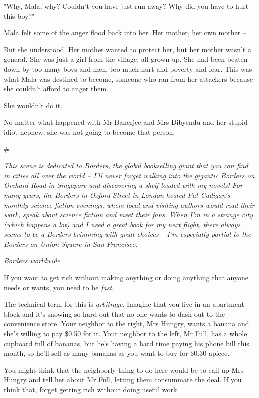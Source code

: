 "Why, Mala, why? Couldn't you have just run away? Why did you have
to hurt this boy?"

Mala felt some of the anger flood back into her. Her mother, her
own mother --

But she understood. Her mother wanted to protect her, but her
mother wasn't a general. She was just a girl from the village, all
grown up. She had been beaten down by too many boys and men, too
much hurt and poverty and fear. This was what Mala was destined to
become, someone who ran from her attackers because she couldn't
afford to anger them.

She wouldn't do it.

No matter what happened with Mr Banerjee and Mrs Dibyendu and her
stupid idiot nephew, she was not going to become that person.

\#

\emph{This scene is dedicated to Borders, the global bookselling giant that you can find in cities all over the world -- I'll never forget walking into the gigantic Borders on Orchard Road in Singapore and discovering a shelf loaded with my novels! For many years, the Borders in Oxford Street in London hosted Pat Cadigan's monthly science fiction evenings, where local and visiting authors would read their work, speak about science fiction and meet their fans. When I'm in a strange city (which happens a lot) and I need a great book for my next flight, there always seems to be a Borders brimming with great choices -- I'm especially partial to the Borders on Union Square in San Francisco.}

\emph{\href{http://www.bordersstores.com/locator/locator.jsp}{Borders worldwide}}

If you want to get rich without making anything or doing anything
that anyone needs or wants, you need to be \emph{fast}.

The technical term for this is \emph{arbitrage}. Imagine that you
live in an apartment block and it's snowing so hard out that no one
wants to dash out to the convenience store. Your neighbor to the
right, Mrs Hungry, wants a banana and she's willing to pay \$0.50
for it. Your neighbor to the left, Mr Full, has a whole cupboard
full of bananas, but he's having a hard time paying his phone bill
this month, so he'll sell as many bananas as you want to buy for
\$0.30 apiece.

You might think that the neighborly thing to do here would be to
call up Mrs Hungry and tell her about Mr Full, letting them
consummate the deal. If you think that, forget getting rich without
doing useful work.

